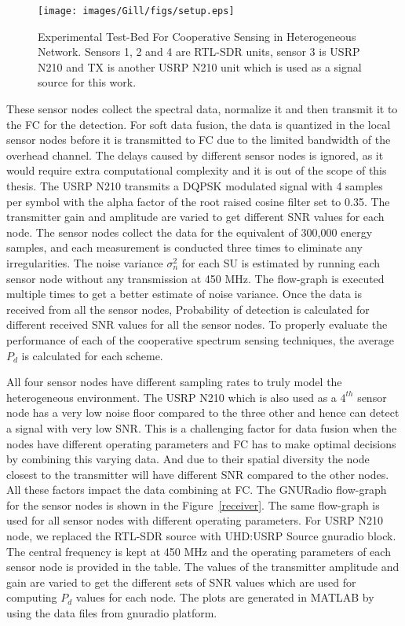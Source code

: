 \begin{figure}
\centering
	\texttt{[image: images/Gill/figs/setup.eps]} 
\caption{Experimental Test-Bed For Cooperative Sensing in Heterogeneous Network. Sensors 1, 2 and 4 are RTL-SDR units, sensor 3 is USRP N210 and TX is another USRP N210 unit which is used as a signal source for this work.}
\label{expsetup}
\end{figure}

These sensor nodes collect the spectral data, normalize it and then transmit it to the FC for the detection. For soft data fusion, the data is quantized in the local sensor nodes before it is transmitted to FC due to the limited bandwidth of the overhead channel. The delays caused by different sensor nodes is ignored, as it would require extra computational complexity and it is out of the scope of this thesis. The USRP N210 transmits a DQPSK modulated signal with 4 samples per symbol with the alpha factor of the root raised cosine filter set to 0.35. The transmitter gain and amplitude are varied to get different SNR values for each node. The sensor nodes collect the data for the equivalent of 300,000 energy samples, and each measurement is conducted three times to eliminate any irregularities. The noise variance $\sigma_n^2$ for each SU is estimated by running each sensor node without any transmission at 450 MHz. The flow-graph is executed multiple times to get a better estimate of noise variance. Once the data is received from all the sensor nodes, Probability of detection is calculated for different received SNR values for all the sensor nodes. To properly evaluate the performance of each of the cooperative spectrum sensing techniques, the average $P_d$ is calculated for each scheme. 

All four sensor nodes have different sampling rates to truly model the heterogeneous environment. The USRP N210 which is also used as a $4^{th}$ sensor node has a very low noise floor compared to the three other and hence can detect a signal with very low SNR. This is a challenging factor for data fusion when the nodes have different operating parameters and FC has to make optimal decisions by combining this varying data. And due to their spatial diversity the node closest to the transmitter will have different SNR compared to the other nodes. All these factors impact the data combining at FC. The GNURadio flow-graph for the sensor nodes is shown in the Figure~\ref{receiver}. The same flow-graph is used for all sensor nodes with different operating parameters. For USRP N210 node, we replaced the RTL-SDR source with UHD:USRP Source gnuradio block. The central frequency is kept at 450 MHz and the operating parameters of each sensor node is provided in the table. The values of the transmitter amplitude and gain are varied to get the different sets of SNR values which are used for computing $P_d$ values for each node. The plots are generated in MATLAB by using the data files from gnuradio platform.

